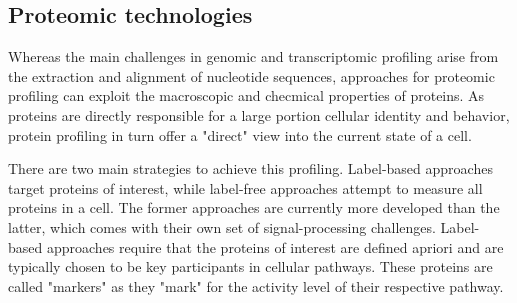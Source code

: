 \subsection{Proteomic technologies}

Whereas the main challenges in genomic and transcriptomic profiling arise from the extraction and alignment of nucleotide sequences,
approaches for proteomic profiling can exploit the macroscopic and checmical properties of proteins.
As proteins are directly responsible for a large portion cellular identity and behavior, protein profiling in turn offer a "direct" view into the current state of a cell.

There are two main strategies to achieve this profiling.
Label-based approaches target proteins of interest, while label-free approaches attempt to measure all proteins in a cell.
The former approaches are currently more developed than the latter, which comes with their own set of signal-processing challenges.
Label-based approaches require that the proteins of interest are defined apriori and are typically chosen to be key participants in cellular pathways.
These proteins are called "markers" as they "mark" for the activity level of their respective pathway.

